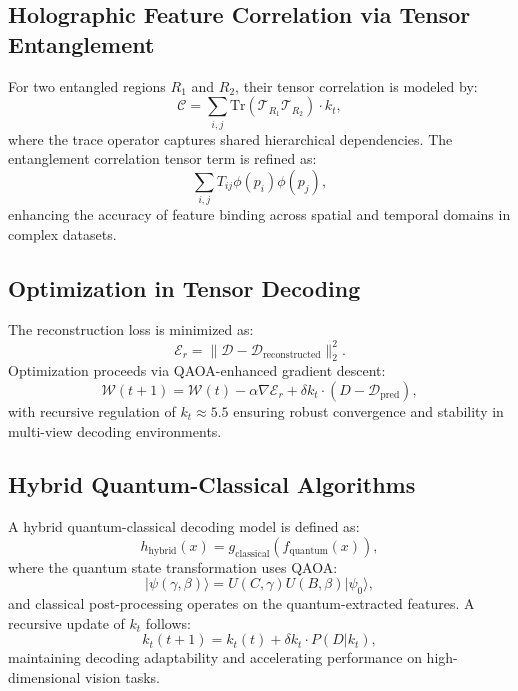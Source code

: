 \documentclass{article}
\theoremstyle{plain}
\begin{document}
\subsection{Holographic Feature Correlation via Tensor Entanglement}
For two entangled regions \( R_1 \) and \( R_2 \), their tensor correlation is modeled by:
\begin{equation}
\mathcal{C} = \sum_{i,j} \text{Tr}(\mathcal{T}_{R_1} \mathcal{T}_{R_2}) \cdot k_t,
\end{equation}
where the trace operator captures shared hierarchical dependencies. The entanglement correlation tensor term is refined as:
\begin{equation}
\sum_{i,j} T_{ij} \phi(p_i) \phi(p_j),
\end{equation}
enhancing the accuracy of feature binding across spatial and temporal domains in complex datasets.

\subsection{Optimization in Tensor Decoding}
The reconstruction loss is minimized as:
\begin{equation}
\mathcal{E}_r = \|\mathcal{D} - \mathcal{D}_\text{reconstructed}\|_2^2.
\end{equation}
Optimization proceeds via QAOA-enhanced gradient descent:
\begin{equation}
\mathcal{W}(t+1) = \mathcal{W}(t) - \alpha \nabla \mathcal{E}_r + \delta k_t \cdot (D - \mathcal{D}_\text{pred}),
\end{equation}
with recursive regulation of \( k_t \approx 5.5 \) ensuring robust convergence and stability in multi-view decoding environments.

\subsection{Hybrid Quantum-Classical Algorithms}
A hybrid quantum-classical decoding model is defined as:
\begin{equation}
h_\text{hybrid}(x) = g_\text{classical}(f_\text{quantum}(x)),
\end{equation}
where the quantum state transformation uses QAOA:
\begin{equation}
|\psi(\gamma, \beta)\rangle = U(C, \gamma) U(B, \beta) |\psi_0\rangle,
\end{equation}
and classical post-processing operates on the quantum-extracted features. A recursive update of \( k_t \) follows:
\begin{equation}
k_t(t+1) = k_t(t) + \delta k_t \cdot P(D | k_t),
\end{equation}
maintaining decoding adaptability and accelerating performance on high-dimensional vision tasks.
\end{document}
